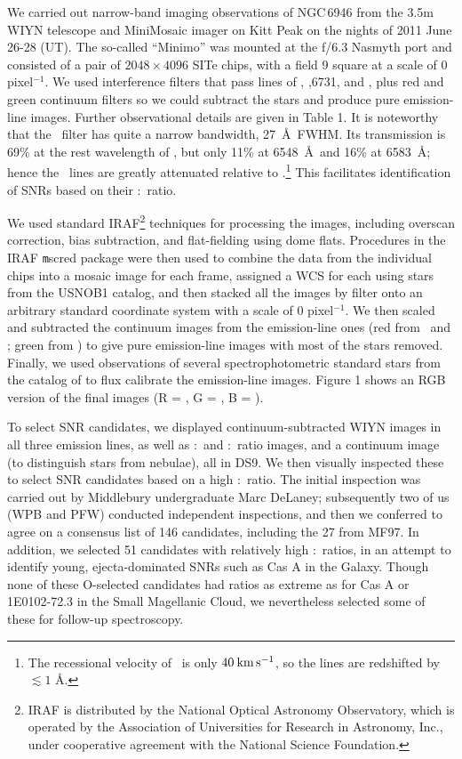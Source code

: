 We carried out narrow-band imaging observations of NGC\,6946 from the 3.5m WIYN telescope and MiniMosaic imager on Kitt Peak on the nights of 2011 June 26-28 (UT).  The so-called ``Minimo'' was mounted at the f/6.3 Nasmyth port and consisted of a pair of $2048\times4096$ SITe chips, with a field  9 square at a scale of 0 pixel$^{-1}$.  We used interference filters that pass lines of \ha, \sii {},6731, and \oiii {}, plus red and green continuum filters so we could subtract the stars and produce pure emission-line images.  Further observational details are given in Table 1.  It is noteworthy that the \ha\ filter has quite a narrow bandwidth, 27\ \AA\ FWHM. Its transmission is 69\% at the rest wavelength of \ha, but only 11\% at 6548\ \AA\ and 16\% at 6583\ \AA; hence the \nii\ lines are greatly attenuated relative to \ha.\footnote{The recessional velocity of \gal\ is only $40 \:\rm{km\,s^{-1}}$, so the lines are redshifted by $\lesssim 1$ \AA.}  This facilitates identification of SNRs based on their \sii:\ha\ ratio.

We used standard IRAF\footnote{IRAF is distributed by the National Optical Astronomy Observatory, which is operated by the Association of Universities for Research in Astronomy, Inc., under cooperative agreement with the National Science Foundation.} techniques for processing the images, including overscan correction, bias subtraction, and flat-fielding using dome flats.  Procedures in the IRAF {\texttt mscred} package were then used to combine the data from the individual chips into a mosaic image for each frame, assigned a WCS for each using stars from the USNOB1 catalog, and then stacked  all the images by   filter onto an arbitrary standard coordinate system with a scale of 0 pixel$^{-1}$.  We then scaled and subtracted the continuum images from the emission-line ones (red from \ha\ and \sii; green from \oiii) to give pure emission-line images with most of the stars removed.  Finally, we used observations of several spectrophotometric standard stars from the catalog of \citet{massey88} to flux calibrate the emission-line images.  Figure 1 shows an RGB version of the final images (R = \ha, G = \sii, B = \oiii).

To select SNR candidates, we displayed continuum-subtracted WIYN images in all three emission lines, as well as \sii:\ha\  and \oiii:\ha\ ratio images, and a continuum image (to distinguish stars from nebulae), all in DS9.   We then visually inspected these to select SNR candidates based on a high  \sii:\ha\ ratio.  The initial inspection was carried out by Middlebury undergraduate Marc DeLaney; subsequently two of us (WPB and PFW) conducted independent inspections, and then we conferred to agree on a consensus list of 146 candidates, including the 27 from MF97.   In addition, we selected 51 candidates with relatively high \oiii:\ha\ ratios, in an attempt to identify young, ejecta-dominated SNRs such as Cas A in the Galaxy.   Though none of these O-selected candidates had ratios as extreme as for Cas A or  1E0102-72.3 in the Small Magellanic Cloud, we nevertheless selected some of these for follow-up spectroscopy.

